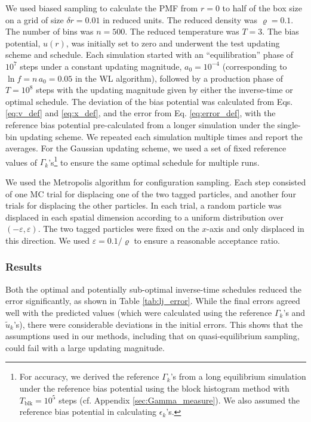 \documentclass[preprint, superscriptaddress, floatfix]{revtex4-1}
\begin{document}
We used biased sampling to calculate
the PMF from $r = 0$ to half of the box size
on a grid of size $\delta r = 0.01$ in reduced units.
%
The reduced density was $\varrho = 0.1$.
The number of bins was $n = 500$.
The reduced temperature was $T = 3$.
%
The bias potential, $u(r)$,
was initially set to zero and
underwent the test updating scheme and schedule.
%
Each simulation started with an ``equilibration'' phase
of $10^7$ steps under a constant updating magnitude,
$a_0 = 10^{-4}$
(corresponding to $\ln f = n \, a_0 = 0.05$ in the WL algorithm),
followed by a production phase of
$T = 10^8$ steps
with the updating magnitude given by
either the inverse-time or optimal schedule.
%
The deviation of the bias potential was calculated from
Eqs. \eqref{eq:v_def} and \eqref{eq:x_def},
and the error from Eq. \eqref{eq:error_def},
with the reference bias potential
pre-calculated from a longer simulation
under the single-bin updating scheme.
%
We repeated each simulation multiple times
and report the averages.
%
For the Gaussian updating scheme,
we used a set of fixed reference values of $\Gamma_k$'s\footnote{For
  accuracy, we derived the reference $\Gamma_k$'s
  from a long equilibrium simulation under the reference bias 
  potential using the block histogram method with $T_\mathrm{blk} = 10^5$ steps
  (cf. Appendix \ref{sec:Gamma_measure}).
  We also assumed the reference bias potential in calculating $\epsilon_k$'s.}
to ensure the same optimal schedule for multiple runs.


We used the Metropolis algorithm\cite{frenkel, metropolis1953}
for configuration sampling.
%
Each step consisted of
one MC trial for displacing one of the two tagged particles,
and another four trials for displacing the other particles.
%
In each trial,
a random particle was displaced in each spatial dimension
according to a uniform distribution over $(-\varepsilon, \varepsilon)$.
%
The two tagged particles were fixed on the $x$-axis
and only displaced in this direction.
%
We used $\varepsilon = 0.1/\varrho$
to ensure a reasonable acceptance ratio.



\subsubsection{Results}




Both the optimal and potentially sub-optimal inverse-time schedules
reduced the error significantly,
as shown in Table \ref{tab:lj_error}.
%
While the final errors agreed well with
the predicted values (which were calculated using the reference
$\Gamma_k$'s and $\tilde u_k$'s),
there were considerable deviations
in the initial errors.
%
This shows that
the assumptions used in our methods,
including that on quasi-equilibrium sampling,
could fail with a large updating magnitude.
\end{document}
